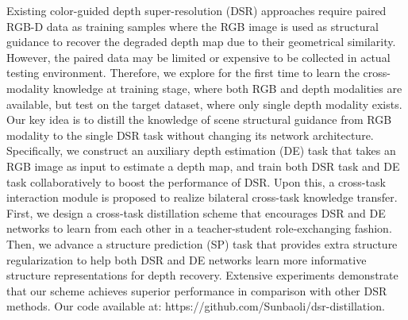 \begin{appendix}

\vspace{5bp}

\vspace{25bp}

\vspace{25bp}

\vspace{20bp}

\vspace{25bp}
\noindent {} Existing color-guided depth super-resolution (DSR) approaches require paired RGB-D data as training samples where the RGB image is used as structural guidance to recover the degraded depth map due to their geometrical similarity. However, the paired data may be limited or expensive to be collected in actual testing environment. Therefore, we explore for the first time to learn the cross-modality knowledge at training stage, where both RGB and depth modalities are available, but test on the target dataset, where only single depth modality exists. Our key idea is to distill the knowledge of scene structural guidance from RGB modality to the single DSR task without changing its network architecture. Specifically, we construct an auxiliary depth estimation (DE) task that takes an RGB image as input to estimate a depth map, and train both DSR task and DE task collaboratively to boost the performance of DSR. Upon this, a cross-task interaction module is proposed to realize bilateral cross-task knowledge transfer. First, we design a cross-task distillation scheme that encourages DSR and DE networks to learn from each other in a teacher-student role-exchanging fashion. Then, we advance a structure prediction (SP) task that provides extra structure regularization to help both DSR and DE networks learn more informative structure representations for depth recovery. Extensive experiments demonstrate that our scheme achieves superior performance in comparison with other DSR methods. Our code available at: https://github.com/Sunbaoli/dsr-distillation.






\end{appendix}
